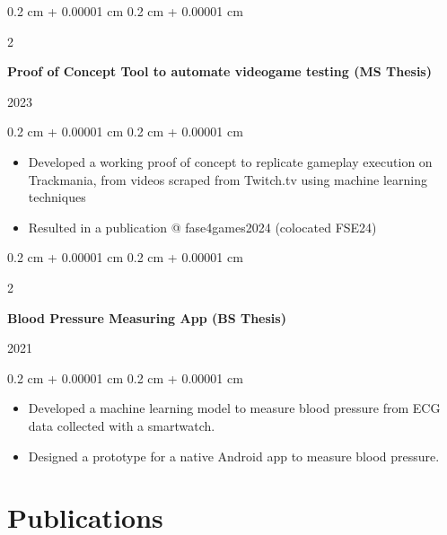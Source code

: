 \documentclass[10pt, letterpaper]{article}
\newenvironment{highlights}{
    \begin{itemize}[
        topsep=0.10 cm,
        parsep=0.10 cm,
        partopsep=0pt,
        itemsep=0pt,
        leftmargin=0.4 cm + 10pt
    ]
}{
    \end{itemize}
} %
\newenvironment{onecolentry}{
    \begin{adjustwidth}{
        0.2 cm + 0.00001 cm
    }{
        0.2 cm + 0.00001 cm
    }
}{
    \end{adjustwidth}
} %
\newenvironment{twocolentry}[2][]{
    \onecolentry
    \def\secondColumn{#2}
    \setcolumnwidth{\fill, 4.5 cm}
    \begin{paracol}{2}
}{
    \switchcolumn \raggedleft \secondColumn
    \end{paracol}
    \endonecolentry
} %
\begin{document}
        \vspace{0.2 cm}
        
        
        \begin{twocolentry}{
            
            
        2023}
            \textbf{Proof of Concept Tool to automate videogame testing (MS Thesis)}
        \end{twocolentry}

        \vspace{0.10 cm}
        \begin{onecolentry}
            \begin{highlights}
                \item Developed a working proof of concept to replicate gameplay execution on Trackmania, from videos scraped from Twitch.tv using machine learning techniques
                \item Resulted in a publication @ fase4games2024 (colocated FSE24)
            \end{highlights}
        \end{onecolentry}


        \vspace{0.2 cm}

        \begin{twocolentry}{
            
            
        2021}
            \textbf{Blood Pressure Measuring App (BS Thesis)}
        \end{twocolentry}

        \vspace{0.10 cm}
        \begin{onecolentry}
            \begin{highlights}
                \item Developed a machine learning model to measure blood pressure from ECG data collected with a smartwatch.
                \item Designed a prototype for a native Android app to measure blood pressure.
            \end{highlights}
        \end{onecolentry}

        

        
    \section{Publications}
\end{document}
